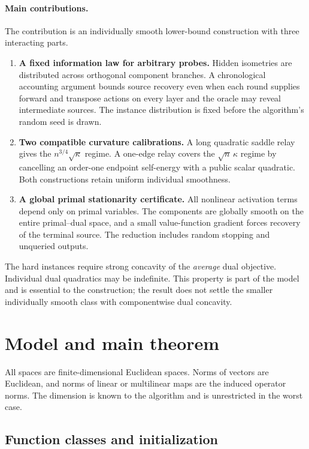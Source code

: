 \documentclass[11pt,letterpaper]{article}
\theoremstyle{definition}
\theoremstyle{remark}
\begin{document}
\paragraph{Main contributions.}
The contribution is an individually smooth lower-bound construction with
three interacting parts.
\begin{enumerate}[label=(\roman*)]
 \item \textbf{A fixed information law for arbitrary probes.}
 Hidden isometries are distributed across orthogonal component branches.
 A chronological accounting argument bounds source recovery even when each
 round supplies forward and transpose actions on every layer and the oracle
 may reveal intermediate sources. The instance distribution is fixed before
 the algorithm's random seed is drawn.
 \item \textbf{Two compatible curvature calibrations.}
 A long quadratic saddle relay gives the $n^{3/4}\sqrt\kappa$ regime.
 A one-edge relay covers the $\sqrt n\,\kappa$ regime by cancelling an
 order-one endpoint self-energy with a public scalar quadratic. Both
 constructions retain uniform individual smoothness.
 \item \textbf{A global primal stationarity certificate.}
 All nonlinear activation terms depend only on primal variables. The
 components are globally smooth on the entire primal--dual space, and a
 small value-function gradient forces recovery of the terminal source.
 The reduction includes random stopping and unqueried outputs.
\end{enumerate}

The hard instances require strong concavity of the \emph{average} dual
objective. Individual dual quadratics may be indefinite. This property is
part of the model and is essential to the construction; the result does not
settle the smaller individually smooth class with componentwise dual
concavity.

\section{Model and main theorem}
\label{sec:model}

All spaces are finite-dimensional Euclidean spaces. Norms of vectors are
Euclidean, and norms of linear or multilinear maps are the induced operator
norms. The dimension is known to the algorithm and is unrestricted in the
worst case.

\subsection{Function classes and initialization}
\end{document}
